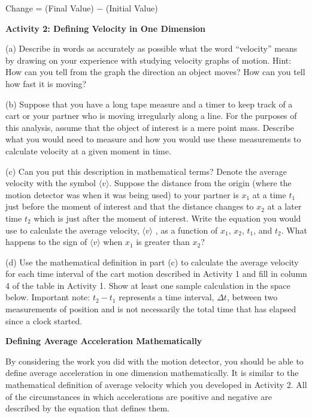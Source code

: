 {\par\centering Change = (Final Value) $-$ (Initial Value)\par}

\textbf{Activity 2: Defining Velocity in One Dimension} 

(a) Describe in words as accurately as possible what the word ``velocity''
means by drawing on your experience with studying velocity graphs of motion.
Hint: How can you tell from the graph the direction an object moves? How can
you tell how fast it is moving?
\answerspace{20mm}

\pagebreak[2]
(b) Suppose that you have a long tape measure and a timer to keep track of a
cart or your partner who is moving irregularly along a line. For the purposes
of this analysis, assume that the object of interest is a mere point mass. Describe
what you would need to measure and how you would use these measurements to calculate
velocity at a given moment in time.
\answerspace{20mm}

(c) Can you put this description in mathematical terms? Denote the
average velocity with the symbol $\langle v\rangle$. Suppose the
distance from the origin (where the motion detector was when it was
being used) to your partner is \( x_{1} \) at a time \( t_{1} \) just
before the moment of interest and that the distance changes to \(
x_{2} \) at a later time \( t_{2} \) which is just after the moment of
interest. Write the equation you would use to calculate the average
velocity, $\langle v\rangle$ , as a function of \( x_{1} \), \( x_{2} \), 
\( t_{1}
\), and \( t_{2} \).  What happens to the sign of $\langle v\rangle$
when \( x_{1}
\) is greater than \( x_{2} \)?
\answerspace{20mm}

(d) Use the mathematical definition in part (c) to calculate the average velocity
for each time interval of the cart motion described in Activity 1 and fill in
column 4 of the table in Activity 1. Show at least one sample calculation in
the space below. Important note: \( t_{2}  - t_{1} \) represents a time
interval, \( \Delta  t\), between two measurements of position and is not necessarily
the total time that has elapsed since a clock started.
\vspace{20mm}

\textbf{Defining Average Acceleration Mathematically} 

By considering the work you did with the motion detector, you should be able
to define average acceleration in one dimension mathematically. It is similar
to the mathematical definition of average velocity which you developed in Activity
2. All of the circumstances in which accelerations are positive and negative
are described by the equation that defines them. 

